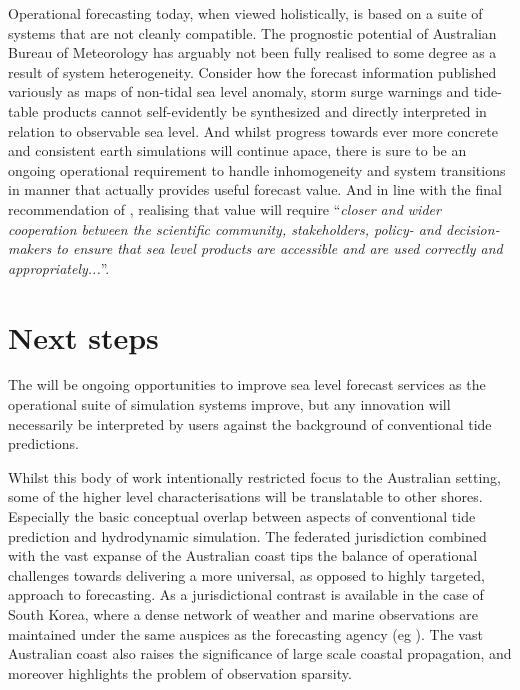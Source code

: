 Operational forecasting today, when viewed holistically, is based on a suite of systems that are not cleanly compatible.
The prognostic potential of Australian Bureau of Meteorology has arguably not been fully realised to some degree as a result of system heterogeneity.  Consider how the forecast information published variously as maps of non-tidal sea level anomaly, storm surge warnings and tide-table products cannot self-evidently be synthesized and directly interpreted in relation to observable sea level.
And whilst progress towards ever more concrete and consistent earth simulations will continue apace, there is sure to be an ongoing operational requirement to handle inhomogeneity and system transitions in manner that actually provides useful forecast value. And in line with the final recommendation of \citep{10.1175/bams-89-4-459}, realising that value will require ``\textit{closer and wider cooperation between the scientific community, stakeholders, policy- and decision-makers to ensure that sea level products are accessible and are used correctly and appropriately...}''. 

\section{Next steps}
The will be ongoing opportunities to improve sea level forecast services as the operational suite of simulation systems improve, but any innovation will necessarily be interpreted by users against the background of conventional tide predictions.

Whilst this body of work intentionally restricted focus to the Australian setting, some of the higher level  characterisations will be translatable to other shores.  Especially the basic conceptual overlap between aspects of conventional tide prediction and hydrodynamic simulation.
The federated jurisdiction combined with the vast expanse of the Australian coast tips the balance of operational challenges towards delivering a more universal, as opposed to highly targeted, approach to forecasting.   As a jurisdictional contrast is available in the case of South Korea, where a dense network of weather and marine observations are maintained under the same auspices as the forecasting agency (eg   
\citep{10.1007/s10236-015-0820-3}).
The vast Australian coast also raises the significance of large scale coastal propagation, and moreover highlights the problem of observation sparsity.


